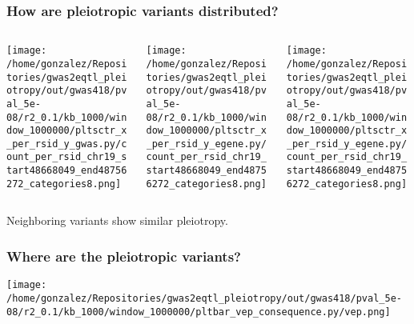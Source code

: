 \documentclass{beamer}
\begin{document}
\begin{frame}
\frametitle{How are pleiotropic variants distributed?}

\begin{columns}
\begin{column}{0.32\textwidth}
    \begin{center}
\texttt{[image: /home/gonzalez/Repositories/gwas2eqtl\_pleiotropy/out/gwas418/pval\_5e-08/r2\_0.1/kb\_1000/window\_1000000/pltsctr\_x\_per\_rsid\_y\_gwas.py/count\_per\_rsid\_chr19\_start48668049\_end48756272\_categories8.png]}
     \end{center}
\end{column}
\begin{column}{0.32\textwidth}
    \begin{center}
\texttt{[image: /home/gonzalez/Repositories/gwas2eqtl\_pleiotropy/out/gwas418/pval\_5e-08/r2\_0.1/kb\_1000/window\_1000000/pltsctr\_x\_per\_rsid\_y\_egene.py/count\_per\_rsid\_chr19\_start48668049\_end48756272\_categories8.png]}
     \end{center}
\end{column}
\begin{column}{0.32\textwidth}
    \begin{center}
\texttt{[image: /home/gonzalez/Repositories/gwas2eqtl\_pleiotropy/out/gwas418/pval\_5e-08/r2\_0.1/kb\_1000/window\_1000000/pltsctr\_x\_per\_rsid\_y\_egene.py/count\_per\_rsid\_chr19\_start48668049\_end48756272\_categories8.png]}
     \end{center}
\end{column}
\end{columns}
%
\vfill
%
Neighboring variants show similar pleiotropy.

\end{frame}

\begin{frame}
\frametitle{Where are the pleiotropic variants?}

    \begin{center}
\texttt{[image: /home/gonzalez/Repositories/gwas2eqtl\_pleiotropy/out/gwas418/pval\_5e-08/r2\_0.1/kb\_1000/window\_1000000/pltbar\_vep\_consequence.py/vep.png]}
     \end{center}
     
\end{frame}
\end{document}
